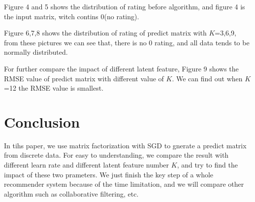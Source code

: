 \documentclass[journal, a4paper]{IEEEtran}
\begin{document}
Figure 4 and 5 shows the distribution of rating before algorithm, and figure 4 is the input matrix, witch contins 0(no rating).

Figure 6,7,8 shows the distribution of rating of predict matrix with $K$=3,6,9, from these pictures we can see that, there is no 0 rating, and all data tends to be normally distributed.

For further compare the impact of different latent feature, Figure 9 shows the RMSE value of predict matrix with different value of $K$. We can find out when $K$=12 the RMSE value is smallest.
\section{Conclusion}
	In tihs paper, we use matrix factorization with SGD to gnerate a predict matrix from  discrete data. For easy to understanding, we compare the result with different learn rate and different latent feature number $K$, and try to find the impact of these two prameters. We just finish the key step of a whole recommender system because of the time limitation, and we will compare other algorithm such as collaborative filtering, etc.



\end{document}

